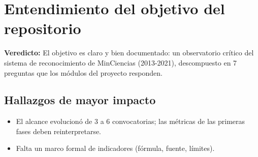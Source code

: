 \section{Entendimiento del objetivo del repositorio}

\begin{tcolorbox}[hallazgo]
\textbf{Veredicto:} El objetivo es claro y bien documentado: un observatorio crítico del sistema de reconocimiento de MinCiencias (2013-2021), descompuesto en 7 preguntas que los módulos del proyecto responden.

\end{tcolorbox}

\subsection{Hallazgos de mayor impacto}

\begin{itemize}
  \item El alcance evolucionó de 3 a 6 convocatorias; las métricas de las primeras fases deben reinterpretarse.
  \item Falta un marco formal de indicadores (fórmula, fuente, límites).
\end{itemize}
